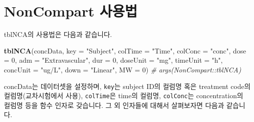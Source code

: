 \documentclass[12pt,]{krantz}
\newenvironment{Shaded}{\begin{snugshade}}{\end{snugshade}}
\newcommand{\KeywordTok}[1]{\textcolor[rgb]{0.13,0.29,0.53}{\textbf{#1}}}
\newcommand{\DataTypeTok}[1]{\textcolor[rgb]{0.13,0.29,0.53}{#1}}
\newcommand{\DecValTok}[1]{\textcolor[rgb]{0.00,0.00,0.81}{#1}}
\newcommand{\StringTok}[1]{\textcolor[rgb]{0.31,0.60,0.02}{#1}}
\newcommand{\CommentTok}[1]{\textcolor[rgb]{0.56,0.35,0.01}{\textit{#1}}}
\newcommand{\NormalTok}[1]{#1}
\theoremstyle{definition}
\theoremstyle{definition}
\theoremstyle{definition}
\theoremstyle{remark}
\begin{document}
\section{NonCompart 사용법}\label{how-to-use}

tblNCA의 사용법은 다음과 같습니다.

\begin{Shaded}
\begin{Highlighting}[]
\KeywordTok{tblNCA}\NormalTok{(concData, }\DataTypeTok{key =} \StringTok{"Subject"}\NormalTok{, }\DataTypeTok{colTime =} \StringTok{"Time"}\NormalTok{, }\DataTypeTok{colConc =} \StringTok{"conc"}\NormalTok{, }
       \DataTypeTok{dose =} \DecValTok{0}\NormalTok{, }\DataTypeTok{adm =} \StringTok{"Extravascular"}\NormalTok{, }\DataTypeTok{dur =} \DecValTok{0}\NormalTok{, }\DataTypeTok{doseUnit =} \StringTok{"mg"}\NormalTok{, }
       \DataTypeTok{timeUnit =} \StringTok{"h"}\NormalTok{, }\DataTypeTok{concUnit =} \StringTok{"ug/L"}\NormalTok{, }\DataTypeTok{down =} \StringTok{"Linear"}\NormalTok{, }\DataTypeTok{MW =} \DecValTok{0}\NormalTok{)}
\CommentTok{# args(NonCompart::tblNCA)}
\end{Highlighting}
\end{Shaded}

concData는 데이터셋을 설정하며, \texttt{key}는 subject ID의 컬럼명 혹은
treatment code의 컬럼명(교차시험에서 사용), \texttt{colTime}은 time의
컬럼명, \texttt{colConc}는 concentration의 컬럼명 등을 함수 인자로
갖습니다. 그 외 인자들에 대해서 살펴보자면 다음과 같습니다.
\end{document}

